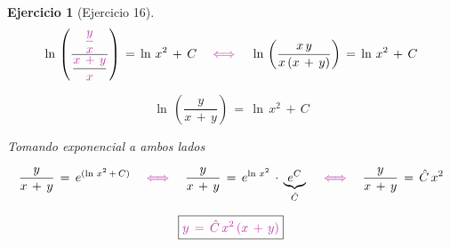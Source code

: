 \documentclass[a4paper,11pt]{book}
\newtheorem{ejer}{Ejercicio}[section]
\begin{document}
\begin{ejer}[Ejercicio 16]
$$\ln\,\left(\dfrac{\textcolor{byzantine}{\dfrac{y}{x}}}{\dfrac{\textcolor{byzantine}{x\,+\,y} }{\textcolor{byzantine}{x}} } \right)\,=\,\ln\,x^{2}\,+\,C \quad \textcolor{byzantine}{\iff} \quad \ln\,\left(\dfrac{x\,y}{x\,(x\,+\,y)} \right)\,=\,\ln\,x^{2}\,+\,C$$ 

$$\ln\,\left(\dfrac{y}{x\,+\,y} \right)\,=\,\ln\,x^{2}\,+\,C $$ 

Tomando exponencial a ambos lados 

 $$\dfrac{y}{x\,+\,y}\,=\,e^{(\ln\,x^{2}\,+\,C)} \quad \textcolor{byzantine}{\iff} \quad \dfrac{y}{x\,+\,y}\,=\,e^{\ln\,x^{2} }\,\cdot\,\underbrace{e^{C}}_{\hat{C}} \quad \textcolor{byzantine}{\iff} \quad \dfrac{y}{x\,+\,y}\,=\,\hat{C}\, x^{2}$$ 

$$\boxed{\textcolor{byzantine}{y\,=\,\hat{C}\, x^{2}\,(x\,+\,y) } } $$ 

\end{ejer} 
\end{document}

